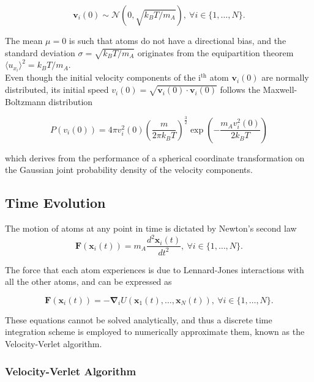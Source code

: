 \documentclass[twocolumn,10pt]{article}
\begin{document}
\begin{equation}
    \mathbf{v}_i(0) \sim \mathcal{N}\left( 0,\sqrt{k_BT/m_A} \right), \ \forall i\in\{1,\dots,N\}.
    \label{gauss}
\end{equation}

\noindent The mean $\mu=0$ is such that atoms do not have a directional bias, and the standard deviation $\sigma = \sqrt{k_BT/m_A}$ originates from the equipartition theorem $\langle u_{x_i} \rangle^2 = k_BT/m_A$.\\

Even though the initial velocity components of the i$^{\text{th}}$ atom $\mathbf{v}_i(0)$ are normally distributed, its initial speed $v_i(0) = \sqrt{\mathbf{v}_i(0)\cdot\mathbf{v}_i(0)}$ follows the Maxwell-Boltzmann distribution

\begin{equation}
    P(v_i(0)) = 4\pi v_i^2(0)\left( \frac{m}{2\pi k_BT}\right)^{\frac{3}{2}} \exp\left(-\frac{m_Av_i^2(0)}{2k_BT}\right)
\end{equation}

\noindent which derives from the performance of a spherical coordinate transformation on the Gaussian joint probability density of the velocity components.

\subsection{Time Evolution}

The motion of atoms at any point in time is dictated by Newton's second law
\begin{equation}
    \mathbf{F}(\mathbf{x}_i(t)) = m_A\frac{d^2\mathbf{x}_i(t)}{dt^2}, \ \forall i\in\{1,\dots,N\}.
    \label{force}
\end{equation}

\noindent The force that each atom experiences is due to Lennard-Jones interactions with all the other atoms, and can be expressed as

\begin{equation}
    \mathbf{F}(\mathbf{x}_i(t)) = -\bm{\nabla}_iU\left( \mathbf{x}_1(t),\dots,\mathbf{x}_N(t)\right), \ \forall i\in\{1,\dots,N\}.
\end{equation}

These equations cannot be solved analytically, and thus a discrete time integration scheme is employed to numerically approximate them, known as the Velocity-Verlet algorithm.

\subsubsection{Velocity-Verlet Algorithm}
\end{document}
